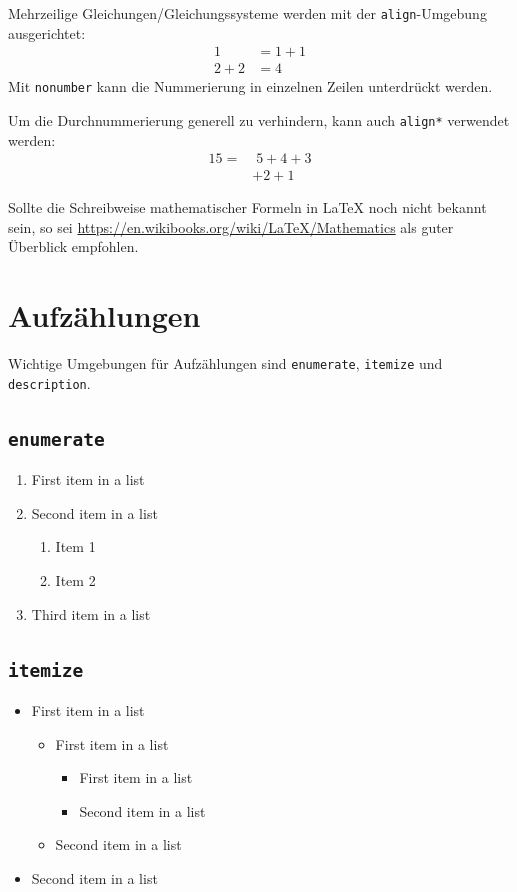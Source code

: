 \documentclass[
  fontsize=12pt,
  numbers=noenddot,
  parskip=half,
  listof=totoc,
  bibliography=totoc,
  headsepline=true,
  footsepline=false,
  DIV=12]{scrartcl}
\begin{document}
Mehrzeilige Gleichungen/Gleichungssysteme werden mit der
\texttt{align}-Umgebung ausgerichtet: \begin{align}
  1   &= 1+1 \nonumber\\
  2+2 &= 4
\end{align} Mit \texttt{nonumber} kann die Nummerierung in einzelnen
Zeilen unterdrückt werden.

Um die Durchnummerierung generell zu verhindern, kann auch
\texttt{align*} verwendet werden: \begin{align*}
  15 =&\; 5 + 4 + 3 \\
      &+ 2 + 1
\end{align*}

Sollte die Schreibweise mathematischer Formeln in LaTeX noch nicht
bekannt sein, so sei
\url{https://en.wikibooks.org/wiki/LaTeX/Mathematics} als guter
Überblick empfohlen.

\hypertarget{aufzuxe4hlungen}{%
\section{Aufzählungen}\label{aufzuxe4hlungen}}

Wichtige Umgebungen für Aufzählungen sind \texttt{enumerate},
\texttt{itemize} und \texttt{description}.

\hypertarget{section}{%
\subsection{\texorpdfstring{\texttt{enumerate}}{}}\label{section}}

\begin{enumerate}
  \item First item in a list
  \item Second item in a list \begin{enumerate}
    \item Item 1
    \item Item 2
  \end{enumerate}
  \item Third item in a list
\end{enumerate}

\hypertarget{section-1}{%
\subsection{\texorpdfstring{\texttt{itemize}}{}}\label{section-1}}

\begin{itemize}
  \item First item in a list
    \begin{itemize}
      \item First item in a list
        \begin{itemize}
          \item First item in a list
          \item Second item in a list
        \end{itemize}
      \item Second item in a list
    \end{itemize}
  \item Second item in a list
\end{itemize}
\end{document}
